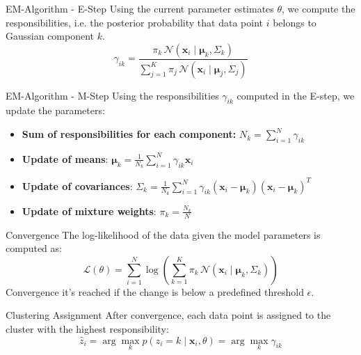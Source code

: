 \begin{frame}{EM-Algorithm - E-Step}
    \centering
    Using the current parameter estimates $\theta$, we compute the responsibilities, i.e. the posterior probability that data point $i$ belongs to Gaussian component $k$.
    \[
    \gamma_{ik} 
    = \frac{\pi_k \, \mathcal{N}(\boldsymbol{x}_i \mid \boldsymbol{\mu}_k, \Sigma_k)}
        {\sum_{j=1}^{K} \pi_j \, \mathcal{N}(\boldsymbol{x}_i \mid \boldsymbol{\mu}_j, \Sigma_j)}
    \]
\end{frame}

\begin{frame}{EM-Algorithm - M-Step}
    \centering
    Using the responsibilities \(\gamma_{ik}\) computed in the E-step, we update the parameters:
    \vfill
    \begin{itemize}
        \item \textbf{Sum of responsibilities for each component:} \(N_k = \sum_{i=1}^{N} \gamma_{ik}\)
        \item \textbf{Update of means}: \(\boldsymbol{\mu}_k = \frac{1}{N_k} \sum_{i=1}^{N} \gamma_{ik} \boldsymbol{x}_i\)   
        \item \textbf{Update of covariances}: \(\Sigma_k = \frac{1}{N_k} \sum_{i=1}^{N} \gamma_{ik} (\boldsymbol{x}_i - \boldsymbol{\mu}_k)(\boldsymbol{x}_i - \boldsymbol{\mu}_k)^T\)
        \item \textbf{Update of mixture weights}: \(\pi_k = \frac{N_k}{N}\)
    \end{itemize}
\end{frame}

\begin{frame}{Convergence}
    \centering
    The log-likelihood of the data given the model parameters is computed as:
    \[
    \mathcal{L}(\theta ) = \sum_{i=1}^{N} \log \left( \sum_{k=1}^{K} \pi_k \, \mathcal{N}(\boldsymbol{x}_i \mid \boldsymbol{\mu}_k, \Sigma_k) \right)
    \]
    Convergence it's reached if the change is below a predefined threshold $\epsilon$.
\end{frame}

\begin{frame}{Clustering Assignment}
    \centering
    After convergence, each data point is assigned to the cluster with the highest responsibility:
    \[
    \hat{z}_i = \arg \max_{k} p(z_i = k \mid \boldsymbol{x}_i, \theta) = \arg\max_{k} \gamma_{ik}
    \]
\end{frame}

